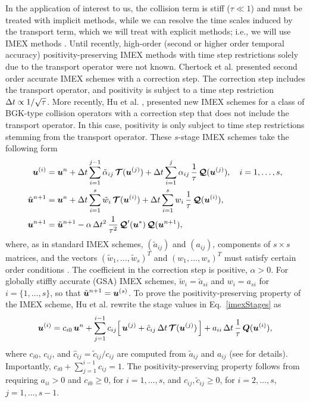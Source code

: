 In the application of interest to us, the collision term is stiff ($\tau\ll1$) and must be treated with implicit methods, while we can resolve the time scales induced by the transport term, which we will treat with explicit methods; i.e., we will use IMEX methods \cite{pareschiRusso_2005}.  
Until recently, high-order (second or higher order temporal accuracy) positivity-preserving IMEX methods with time step restrictions solely due to the transport operator were not known.  
Chertock et al. \cite{chertock_etal_2015} presented second order accurate IMEX schemes with a correction step.  
The correction step includes the transport operator, and positivity is subject to a time step restriction $\Delta t\propto1/\sqrt{\tau}$.  
More recently, Hu et al. \cite{hu_etal_2017}, presented new IMEX schemes for a class of BGK-type collision operators with a correction step that does not include the transport operator.  
In this case, positivity is only subject to time step restrictions stemming from the transport operator.  
These $s$-stage IMEX schemes take the following form \cite{hu_etal_2017}
\begin{align}
  \boldsymbol{u}^{(i)}
  &=\boldsymbol{u}^{n}
  +\Delta t\sum_{i=1}^{j-1}\tilde{\alpha}_{ij}\,\boldsymbol{\mathcal{T}}(\boldsymbol{u}^{(j)})
  +\Delta t\sum_{i=1}^{j}\alpha_{ij}\,\frac{1}{\tau}\,\boldsymbol{\mathcal{Q}}(\boldsymbol{u}^{(j)}),
  \quad i=1,\ldots,s, \label{imexStages} \\
  \tilde{\boldsymbol{u}}^{n+1}
  &=\boldsymbol{u}^{n}
  +\Delta t\sum_{i=1}^{s}\tilde{w}_{i}\,\boldsymbol{\mathcal{T}}(\boldsymbol{u}^{(i)})
  +\Delta t\sum_{i=1}^{s}w_{i}\,\frac{1}{\tau}\,\boldsymbol{\mathcal{Q}}(\boldsymbol{u}^{(i)}), \label{imexIntermediate} \\
  \boldsymbol{u}^{n+1}
  &=\tilde{\boldsymbol{u}}^{n+1}-\alpha\,\Delta t^{2}\,\frac{1}{\tau^{2}}\,\boldsymbol{\mathcal{Q}}'(\boldsymbol{u}^{*})\,\boldsymbol{\mathcal{Q}}(\boldsymbol{u}^{n+1}), \label{eq:imexCorrection}
\end{align}
where, as in standard IMEX schemes, $(\tilde{a}_{ij})$ and $(a_{ij})$, components of $s\times s$ matrices, and the vectors $(\tilde{w}_{1},\ldots,\tilde{w}_{s})^{T}$ and $(w_{1},\ldots,w_{s})^{T}$ must satisfy certain order conditions \cite{pareschiRusso_2005}.  
The coefficient in the correction step is positive, $\alpha>0$.  
For globally stiffly accurate (GSA) IMEX schemes, $\tilde{w}_{i}=\tilde{a}_{si}$ and $w_{i}=a_{si}$ for $i=\{1,\ldots,s\}$, so that $\tilde{\boldsymbol{u}}^{n+1}=\boldsymbol{u}^{(s)}$.  
To prove the positivity-preserving property of the IMEX scheme, Hu et al. \cite{hu_etal_2017} rewrite the stage values in Eq.~\eqref{imexStages} as
\begin{equation}
  \boldsymbol{u}^{(i)}
  =c_{i0}\,\boldsymbol{u}^{n}+\sum_{j=1}^{i-1}c_{ij}\Big[\,\boldsymbol{u}^{(j)}+\hat{c}_{ij}\,\Delta t\,\boldsymbol{\mathcal{T}}(\boldsymbol{u}^{(j)})\,\Big]
  +a_{ii}\,\Delta t\,\frac{1}{\tau}\,\boldsymbol{Q}(\boldsymbol{u}^{(i)}),
  \label{eq:imexStagesRewrite}
\end{equation}
where $c_{i0}$, $c_{ij}$, and $\hat{c}_{ij}=\tilde{c}_{ij}/c_{ij}$ are computed from $\tilde{a}_{ij}$ and $a_{ij}$ (see \cite{hu_etal_2017} for details).  
Importantly, $c_{i0}+\sum_{j=1}^{i-1}c_{ij}=1$.  
The positivity-preserving property follows from requiring $a_{ii}>0$ and $c_{i0}\ge0$, for $i=1,\ldots,s$, and $c_{ij},\tilde{c}_{ij}\ge0$, for $i=2,\ldots,s$, $j=1,\ldots,s-1$.  
